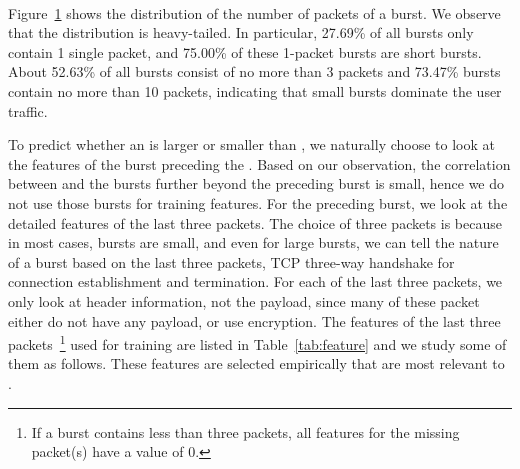 \begin{figure}[t]
\centering
{} \\
\label{fig:packetNum}
\end{figure}
Figure~\ref{fig:packetNum} shows the distribution of the number of packets of a burst. We observe that the distribution is heavy-tailed. In particular, 27.69\% of all bursts only contain 1 single packet, and 75.00\% of these 1-packet bursts are short bursts. About 52.63\% of all bursts consist of no more than 3 packets and 73.47\% bursts contain no more than 10 packets, indicating that small bursts dominate the user traffic.



To predict whether an \IBT is larger or smaller than \SBT, we naturally choose to look at the features of the burst preceding the \IBT. Based on our observation, the correlation between \IBT and the bursts further beyond the preceding burst is small, hence we do not use those bursts for training features. For the preceding burst, we look at the detailed features of the last three packets. The choice of three packets is because in most cases, bursts are small, and even for large bursts, we can tell the nature of a burst based on the last three packets, \eg TCP three-way handshake for connection establishment and termination. For each of the last three packets, we only look at header information, not the payload, since many of these packet either do not have any payload, or use encryption. The features of the last three packets~\footnote{If a burst contains less than three packets, all features for the missing packet(s) have a value of 0.} used for training are listed in Table~\ref{tab:feature} and we study some of them as follows. These features are selected empirically that are most relevant to \IBT.


